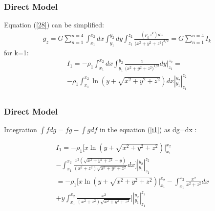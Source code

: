 \documentclass{beamer}
\begin{document}
\begin{frame}
\frametitle{Direct Model}
Equation (\ref{28}) can be simplified:
\begin{eqnarray}
 g_z = G\sum_{n=1}^{n=4} \int_{x_1}^{x_2}dx \int_{y_1}^{y_2}dy \int_{z_1}^{z_2} \frac{(\rho_k z^k) dz}{ ({x^2 + y^2 + z^2)} ^{3/2}} =  G\sum_{n=1}^{n=4} I_k   \label{291}
 \end{eqnarray}
 for k=1:
  \begin{eqnarray}
 I_1 = - \rho_1 \int_{x_1}^{x_2}dx \int_{y_1}^{y_2} \frac{1} {({x^2 + y^2 + z^2)} ^{1/2}}dy |_{z_1}^{z_2} = \nonumber \\ 
 - \rho_1 \int_{x_1}^{x_2} {\ln {(y+ \sqrt{{x^2 + y^2 + z^2}})}} dx |_{y_1}^{y_2}|_{z_1}^{z_2} \nonumber \\  \label{i1}
 \end{eqnarray}

\end{frame}


\begin{frame}
\frametitle{Direct Model}
Integration $\int fdg = fg - \int g df$ in the equation (\ref{i1}) as dg=dx :

\begin{eqnarray}
&&I_1= -\rho_1 [ x{\ln {(y+ \sqrt{{x^2 + y^2 + z^2}})}}|_{x_1}^{x_2} \nonumber \\ 
&& - \int_{x_1}^{x_2} \frac{x^2{(\sqrt{{x^2 + y^2 + z^2}}-y)}} {(x^2+z^2) \sqrt{x^2 + y^2 + z^2}}dx ]|_{y_1}^{y_2}|_{z_1}^{z_2} \nonumber \\ 
&&= -\rho_1 [ x{\ln {(y+ \sqrt{{x^2 + y^2 + z^2}})}}|_{x_1}^{x_2}  - \int_{x_1}^{x_2} \frac{x^2}{x^2+z^2} dx \nonumber \\ 
&&+ y \int_{x_1}^{x_2} \frac{x^2}{{(x^2+z^2) \sqrt{x^2 + y^2 + z^2}}} ]|_{y_1}^{y_2}|_{z_1}^{z_2} \nonumber \\
\label{i2}
\end{eqnarray}

\end{frame}
\end{document}
